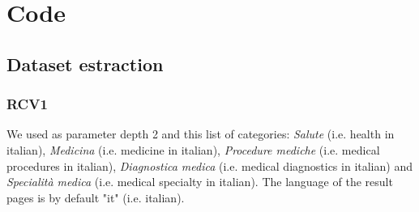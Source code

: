 \appendix
\chapter{Code}

\section{Dataset estraction}

\subsection{RCV1}
\label{appendix:petscanQuery}
We used as parameter depth 2 and this list of categories: \textit{Salute} (i.e. health in italian), \textit{Medicina} (i.e. medicine in italian),  \textit{Procedure mediche} (i.e. medical procedures in italian),  \textit{Diagnostica medica} (i.e. medical diagnostics in italian) and \textit{Specialità medica} (i.e. medical specialty in italian). The language of the result pages is by default "it" (i.e. italian).

